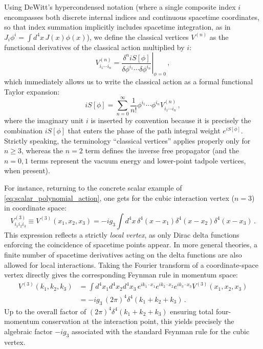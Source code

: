 Using DeWitt's hypercondensed notation (where a single composite index \(i\) encompasses both discrete internal indices and continuous spacetime coordinates, so that index summation implicitly includes spacetime integration, as in \(J_i \phi^i = \int d^4x \, J(x)\phi(x)\)), we define the classical vertices \(V^{(n)}\) as the functional derivatives of the classical action multiplied by \(i\):
\begin{equation} \label{eq:classical_vertices_def}
    \boxed{V^{(n)}_{i_1 \cdots i_n} = \left. \frac{\delta^n iS[\phi]}{\delta\phi^{i_1} \cdots \delta\phi^{i_n}} \right|_{\phi=0}} \, ,
\end{equation}
which immediately allows us to write the classical action as a formal functional Taylor expansion:
\begin{equation} \label{eq:action_taylor_expansion}
    iS[\phi] = \sum_{n=0}^\infty \frac{1}{n!} \phi^{i_1} \cdots \phi^{i_n} V^{(n)}_{i_1 \cdots i_n} \, ,
\end{equation}
where the imaginary unit \(i\) is inserted by convention because it is precisely the combination \(iS[\phi]\) that enters the phase of the path integral weight \(e^{iS[\phi]}\). Strictly speaking, the terminology ``classical vertices'' applies properly only for \(n \ge 3\), whereas the \(n=2\) term defines the inverse free propagator (and the \(n=0, 1\) terms represent the vacuum energy and lower-point tadpole vertices, when present).

For instance, returning to the concrete scalar example of \eqref{eq:scalar_polynomial_action}, one gets for the cubic interaction vertex (\(n=3\)) in coordinate space:
\begin{equation} \label{eq:cubic_vertex_coord}
    V^{(3)}_{i_1 i_2 i_3} \equiv V^{(3)}(x_1, x_2, x_3) = -ig_3 \int d^4x \, \delta^4(x - x_1)\delta^4(x - x_2)\delta^4(x - x_3) \, .
\end{equation}
This expression reflects a strictly \textit{local vertex}, as only Dirac delta functions enforcing the coincidence of spacetime points appear. In more general theories, a finite number of spacetime derivatives acting on the delta functions are also allowed for local interactions. Taking the Fourier transform of a coordinate-space vertex directly gives the corresponding Feynman rule in momentum space:
\begin{equation} \label{eq:cubic_vertex_momentum}
    \begin{aligned}
        V^{(3)}(k_1, k_2, k_3) & = \int d^4x_1 d^4x_2 d^4x_3 \, e^{ik_1 \cdot x_1} e^{ik_2 \cdot x_2} e^{ik_3 \cdot x_3} V^{(3)}(x_1, x_2, x_3) \\
                               & = -ig_3 \, (2\pi)^4 \delta^4(k_1 + k_2 + k_3) \, .
    \end{aligned}
\end{equation}
Up to the overall factor of \((2\pi)^4 \delta^4(k_1 + k_2 + k_3)\) ensuring total four-momentum conservation at the interaction point, this yields precisely the algebraic factor \(-ig_3\) associated with the standard Feynman rule for the cubic vertex.


